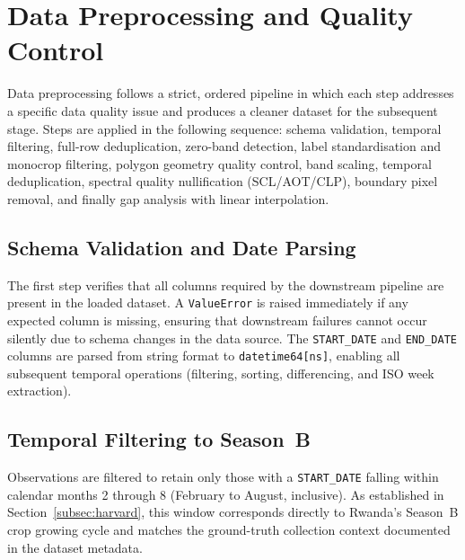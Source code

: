 \section{Data Preprocessing and Quality Control}
\label{sec:preprocessing}

Data preprocessing follows a strict, ordered pipeline in which each step
addresses a specific data quality issue and produces a cleaner dataset
for the subsequent stage. Steps are applied in the following sequence:
schema validation, temporal filtering, full-row deduplication, zero-band
detection, label standardisation and monocrop filtering, polygon geometry
quality control, band scaling, temporal deduplication, spectral quality
nullification (SCL/AOT/CLP), boundary pixel removal, and finally gap
analysis with linear interpolation.


\subsection{Schema Validation and Date Parsing}
\label{subsec:schema_val}

The first step verifies that all columns required by the downstream
pipeline are present in the loaded dataset. A \texttt{ValueError} is
raised immediately if any expected column is missing, ensuring that
downstream failures cannot occur silently due to schema changes in the
data source. The \texttt{START\_DATE} and \texttt{END\_DATE} columns are
parsed from string format to \texttt{datetime64[ns]}, enabling all
subsequent temporal operations (filtering, sorting, differencing,
and ISO week extraction).


\subsection{Temporal Filtering to Season~B}
\label{subsec:temporal_filter}

Observations are filtered to retain only those with a \texttt{START\_DATE}
falling within calendar months 2 through 8 (February to August,
inclusive). As established in Section~\ref{subsec:harvard}, this window
corresponds directly to Rwanda's Season~B crop growing cycle and matches
the ground-truth collection context documented in the dataset metadata.

